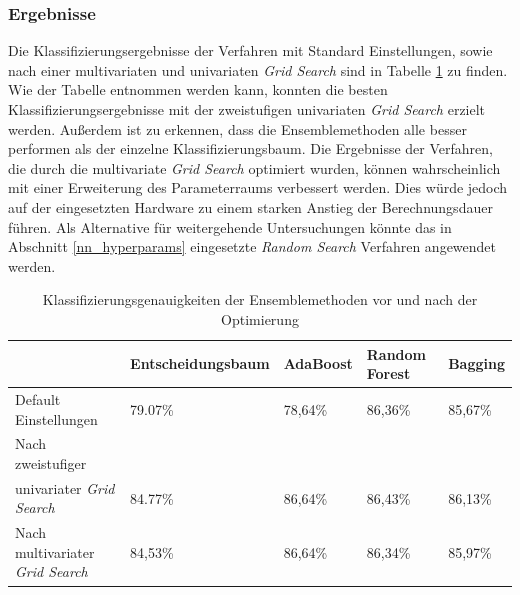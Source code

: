 \subsubsection{Ergebnisse}
Die Klassifizierungsergebnisse der Verfahren mit Standard Einstellungen, sowie nach einer multivariaten und univariaten \emph{Grid Search} sind in Tabelle \ref{table:results_grid} zu finden. Wie der Tabelle entnommen werden kann, konnten die besten Klassifizierungsergebnisse mit der zweistufigen univariaten \emph{Grid Search} erzielt werden. Außerdem ist zu erkennen, dass die Ensemblemethoden alle besser performen als der einzelne Klassifizierungsbaum. Die Ergebnisse der Verfahren, die durch die multivariate \emph{Grid Search} optimiert wurden, können wahrscheinlich mit einer Erweiterung des Parameterraums verbessert werden. Dies würde jedoch auf der eingesetzten Hardware zu einem starken Anstieg der Berechnungsdauer führen. Als Alternative für weitergehende Untersuchungen könnte das in Abschnitt \ref{nn_hyperparams} eingesetzte \emph{Random Search} Verfahren angewendet werden.

\begin{table}[h]
	\begin{tabular}{lllll}
		\hline
		& Entscheidungsbaum & AdaBoost & Random Forest & Bagging \\ \hline
		Default Einstellungen         &    79.07\%               &  78,64\%        &  86,36\%             &  85,67\%       \\
		Nach zweistufiger\\
		univariater \emph{Grid Search}   &  84.77\%              &  86,64\%        &        86,43\%       &    86,13\%     \\
		Nach multivariater \emph{Grid Search} &  84,53\%                 &  86,64\%      &   86,34\%              &    85,97\%     \\ \hline
	\end{tabular}
	\caption{\label{table:results_grid} Klassifizierungsgenauigkeiten der Ensemblemethoden vor und nach der Optimierung}
\end{table}



